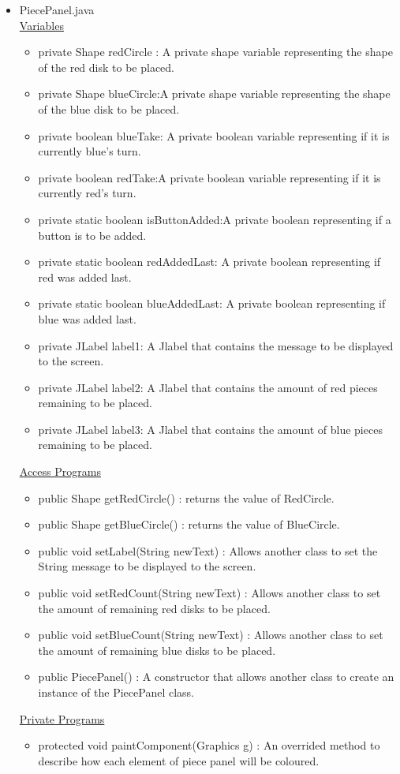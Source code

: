 \documentclass[12pt]{article}
\begin{document}
\begin{itemize}
		\item PiecePanel.java \\
		\underline{Variables}
		\begin{itemize}
			\item private Shape redCircle : A private shape variable representing the shape of the red disk to be placed.
			\item private Shape blueCircle:A private shape variable representing the shape of the blue disk to be placed.
			\item private boolean blueTake: A private boolean variable representing if it is currently blue's turn.
			\item private boolean redTake:A private boolean variable representing if it is currently red's turn.
			\item private static boolean isButtonAdded:A private boolean representing if a button is to be added.
			\item private static boolean redAddedLast: A private boolean representing if red was added last.
			\item private static boolean blueAddedLast: A private boolean representing if blue was added last.
			\item private JLabel label1: A Jlabel that contains the message to be displayed to the screen.
			\item private JLabel label2: A Jlabel that contains the amount of red pieces remaining to be placed.
			\item private JLabel label3: A Jlabel that contains the amount of blue pieces remaining to be placed.
		\end{itemize}
		\underline{Access Programs}
		\begin{itemize}
				\item public Shape getRedCircle() : returns the value of RedCircle.
				\item public Shape getBlueCircle() : returns the value of BlueCircle.
				\item public void setLabel(String newText) : Allows another class to set the String message to be displayed to the screen.
				\item public void setRedCount(String newText) : Allows another class to set the amount of remaining red disks to be placed.
				\item public void setBlueCount(String newText) : Allows another class to set the amount of remaining blue disks to be placed.
				\item public PiecePanel() : A constructor that allows another class to create an instance of the PiecePanel class.
		\end{itemize}
		\underline{Private Programs}
		\begin{itemize}
			\item protected void paintComponent(Graphics g) : An overrided method to describe how each element of piece panel will be coloured. 
			
		\end{itemize}		
	\end{itemize}
\end{document}
